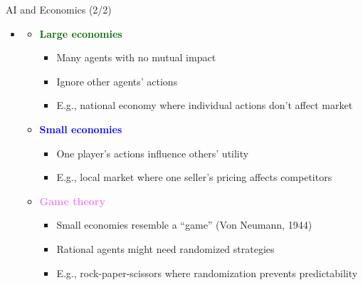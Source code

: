 \documentclass[
  10pt,
  ignorenonframetext,
]{beamer}
\providecommand{\tightlist}{%
  \setlength{\itemsep}{0pt}\setlength{\parskip}{0pt}}
\begin{document}
\begin{frame}{AI and Economics (2/2)}
\label{ai-and-economics-22}
\begin{itemize}
\tightlist
\item
  \textbf{\textcolor{red}{\textcolor{black}{}}}

  \begin{itemize}
  \tightlist
  \item
    \textbf{\textcolor{darkgreen}{Large economies}}

    \begin{itemize}
    \tightlist
    \item
      Many agents with no mutual impact
    \item
      Ignore other agents' actions
    \item
      E.g., national economy where individual actions don't affect
      market
    \end{itemize}
  \item
    \textbf{\textcolor{blue}{Small economies}}

    \begin{itemize}
    \tightlist
    \item
      One player's actions influence others' utility
    \item
      E.g., local market where one seller's pricing affects competitors
    \end{itemize}
  \item
    \textbf{\textcolor{violet}{Game theory}}

    \begin{itemize}
    \tightlist
    \item
      Small economies resemble a ``game'' (Von Neumann, 1944)
    \item
      Rational agents might need randomized strategies
    \item
      E.g., rock-paper-scissors where randomization prevents
      predictability
    \end{itemize}
  \end{itemize}
\end{itemize}
\end{frame}
\end{document}
